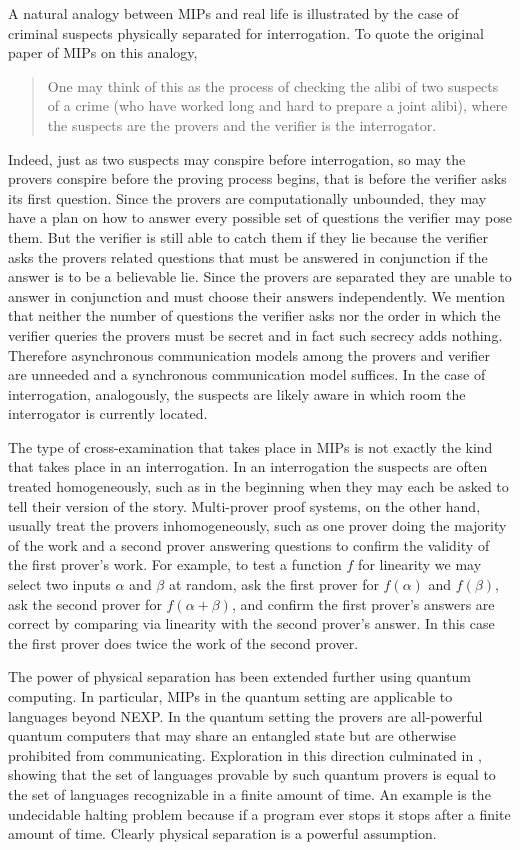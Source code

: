 A natural analogy between MIPs and real life is illustrated by the case of criminal suspects physically separated for interrogation.
To quote the original paper \cite{BGKW88} of MIPs on this analogy,
\begin{quote}
    One may think of this as the process of checking the alibi of two suspects of a crime (who have worked long and hard to prepare a joint alibi), where the suspects are the provers and the verifier is the interrogator.
\end{quote}
Indeed, just as two suspects may conspire before interrogation, so may the provers conspire before the proving process begins, that is before the verifier asks its first question.
Since the provers are computationally unbounded, they may have a plan on how to answer every possible set of questions the verifier may pose them.
But the verifier is still able to catch them if they lie because the verifier asks the provers related questions that must be answered in conjunction if the answer is to be a believable lie.
Since the provers are separated they are unable to answer in conjunction and must choose their answers independently.
We mention that neither the number of questions the verifier asks nor the order in which the verifier queries the provers must be secret and in fact such secrecy adds nothing.
Therefore asynchronous communication models among the provers and verifier are unneeded and a synchronous communication model suffices.
In the case of interrogation, analogously, the suspects are likely aware in which room the interrogator is currently located.

The type of cross-examination that takes place in MIPs is not exactly the kind that takes place in an interrogation.
In an interrogation the suspects are often treated homogeneously, such as in the beginning when they may each be asked to tell their version of the story.
Multi-prover proof systems, on the other hand, usually treat the provers inhomogeneously, such as one prover doing the majority of the work and a second prover answering questions to confirm the validity of the first prover's work.
For example, to test a function $f$ for linearity we may select two inputs $\alpha$ and $\beta$ at random, ask the first prover for $f(\alpha)$ and $f(\beta)$, ask the second prover for $f(\alpha+\beta)$, and confirm the first prover's answers are correct by comparing via linearity with the second prover's answer.
In this case the first prover does twice the work of the second prover.

The power of physical separation has been extended further using quantum computing.
In particular, MIPs in the quantum setting are applicable to languages beyond NEXP.
In the quantum setting the provers are all-powerful quantum computers that may share an entangled state but are otherwise prohibited from communicating.
Exploration in this direction culminated in \cite{JNV+20}, showing that the set of languages provable by such quantum provers is equal to the set of languages recognizable in a finite amount of time.
An example is the undecidable halting problem because if a program ever stops it stops after a finite amount of time.
Clearly physical separation is a powerful assumption.

